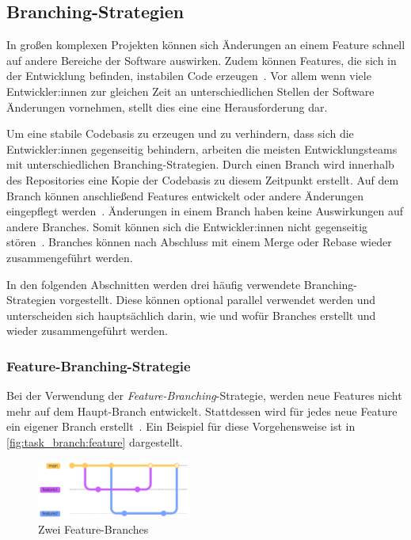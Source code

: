 
\subsection{Branching-Strategien}
\label{sec:workflows:branching}

In großen komplexen Projekten können sich Änderungen an einem Feature schnell auf andere Bereiche der Software auswirken. Zudem können Features, die sich in der Entwicklung befinden, instabilen Code erzeugen~\cite{sorin_dumitrescu_what_2021}. Vor allem wenn viele Entwickler:innen zur gleichen Zeit an unterschiedlichen Stellen der Software Änderungen vornehmen, stellt dies eine eine Herausforderung dar.

Um eine stabile Codebasis zu erzeugen und zu verhindern, dass sich die Entwickler:innen gegenseitig behindern, arbeiten die meisten Entwicklungsteams mit unterschiedlichen Branching\hyp Strategien. Durch einen Branch wird innerhalb des Repositories eine Kopie der Codebasis zu diesem Zeitpunkt erstellt. Auf dem Branch können anschließend Features entwickelt oder andere Änderungen eingepflegt werden~\cite{atlassian_hintergrundwissen_2023}. Änderungen in einem Branch haben keine Auswirkungen auf andere Branches. Somit können sich die Entwickler:innen nicht gegenseitig stören~\cite{atlassian_hintergrundwissen_2023}. Branches können nach Abschluss mit einem Merge oder Rebase wieder zusammengeführt werden.

In den folgenden Abschnitten werden drei häufig verwendete Branching\hyp Strategien vorgestellt. Diese können optional parallel verwendet werden und unterscheiden sich hauptsächlich darin, wie und wofür Branches erstellt und wieder zusammengeführt werden.


\subsubsection{Feature\hyp Branching\hyp Strategie}

Bei der Verwendung der \emph{Feature\hyp Branching}\hyp Strategie, werden neue Features nicht mehr auf dem Haupt\hyp Branch entwickelt. Stattdessen wird für jedes neue Feature ein eigener Branch erstellt~\cite{atlassian_feature_2023}. Ein Beispiel für diese Vorgehensweise ist in \autoref{fig:task_branch:feature} dargestellt.

\begin{figure}
    \includegraphics[width=0.45\textwidth]{src/assets/diagrams/task_branch/feature-branch.pdf}
    \caption{Zwei Feature\hyp Branches}
    \label{fig:task_branch:feature}
\end{figure}

